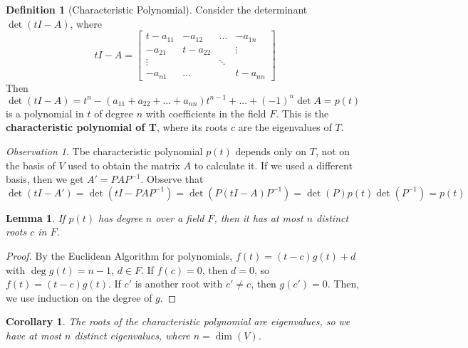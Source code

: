 \documentclass[12pt]{article}
\newtheorem{lem}[thm]{Lemma}  %
\newtheorem{cor}[thm]{Corollary}
\theoremstyle{definition}
\newtheorem{defn}[thm]{Definition}
\theoremstyle{remark}
\newtheorem{obs}[thm]{Observation}
\numberwithin{equation}{section}
\newcommand\B[1]{\textbf{ #1}}
\begin{document}
\vspace{15pt}

\begin{defn}[Characteristic Polynomial]
        Consider the determinant $\det(tI - A)$, where \begin{equation}
                tI - A = \begin{bmatrix} t - a_{11} & -a_{12} & \hdots & -a_{1n} \\ -a_{21} & t-a_{22} & & \vdots\\ \vdots & & \ddots & \\ -a_{n1} & \hdots & & t-a_{nn} \end{bmatrix}
        \end{equation}
        Then $\det(tI - A) = t^n - (a_{11}+a_{22}+...+a_{nn})t^{n-1} + ... + (-1)^n\det A = p(t)$ is a polynomial in $t$ of degree $n$ with coefficients in the field $F$. This is the \B{characteristic polynomial of T}, where its roots $c$ are the eigenvalues of $T$.
\end{defn}

\vspace{15pt}

\begin{obs}
        Tbe characteristic polynomial $p(t)$ depends only on $T$, not on the basis of $V$ used to obtain the matrix $A$ to calculate it. If we used a different basis, then we get $A' = PAP^{-1}$. Observe that \begin{equation}
                \det(tI - A')=\det(tI - PAP^{-1}) = \det(P(tI - A)P^{-1}) = \det(P)p(t)\det(P^{-1}) = p(t)
        \end{equation}
\end{obs}

\vspace{15pt}

\begin{lem}
        If $p(t)$ has degree $n$ over a field $F$, then it has at most $n$ distinct roots $c$ in $F$.
\end{lem}
\begin{proof}
        By the Euclidean Algorithm for polynomials, $f(t) = (t-c)g(t) + d$ with $\deg g(t) = n-1$, $d \in F$. If $f(c) = 0$, then $d = 0$, so $f(t) = (t-c)g(t)$. If $c'$ is another root with $c' \neq c$, then $g(c') = 0$. Then, we use induction on the degree of $g$.
\end{proof}

\vspace{15pt}

\begin{cor}
        The roots of the characteristic polynomial are eigenvalues, so we have at most $n$ distinct eigenvalues, where $n = \dim(V)$.
\end{cor}
\end{document}
